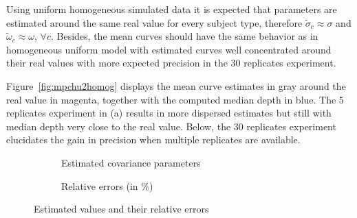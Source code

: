 Using uniform homogeneous simulated data it is expected that parameters are estimated around the same real value for every subject type, therefore $\tilde{\sigma}_c \approx \sigma$ and $\tilde{\omega}_c \approx \omega, \, \forall c$. Besides,  the mean curves should have the same behavior as in homogeneous uniform model with estimated curves well concentrated around their real values with more expected precision in the 30 replicates experiment.

Figure~\ref{fig:mpchu2homog} displays the mean curve estimates in gray around the real value in magenta, together with the computed median depth in blue. The 5 replicates experiment in (a) results in more dispersed estimates but still with median depth very close to the real value. Below, the 30 replicates experiment elucidates the gain in precision when  multiple replicates are available.




\begin{figure}[t]
  \begin{subfigure}{\textwidth}
  \centering
\begin{knitrout}
\color{fgcolor}\begin{kframe}


{\ttfamily\noindent\bfseries{}}

{\ttfamily\noindent\bfseries{}}

{\ttfamily\noindent\bfseries\color{errorcolor}{\#\# Error in lapply(list(hu2homog5, hu2homog30), function(x) x\$cov\_par): object 'hu2homog5' not found}}

{\ttfamily\noindent\bfseries{}}

{\ttfamily\noindent\bfseries\color{errorcolor}{\#\# Error in eval(lhs, parent, parent): object 'cp' not found}}\end{kframe}
\end{knitrout}
    \caption{Estimated covariance parameters} \label{fig:cpest-hu2homog}
  \end{subfigure}
  \begin{subfigure}{\textwidth}
  \centering
\begin{knitrout}
\color{fgcolor}\begin{kframe}


{\ttfamily\noindent\bfseries\color{errorcolor}{\#\# Error in eval(lhs, parent, parent): object 'cp' not found}}\end{kframe}
\end{knitrout}
    \caption{Relative errors (in \%) }\label{fig:re-hu2homog}
  \end{subfigure}
  \caption{Estimated values and their relative errors}
  \label{fig:cp-hu2homog}
\end{figure}  

